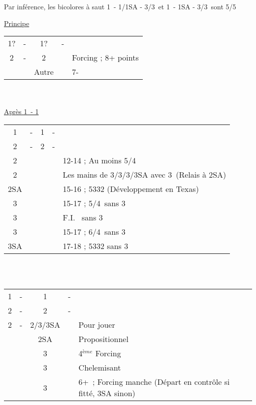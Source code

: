 \documentclass[a4paper, oneside, 11pt]{report}
\begin{document}
		Par inférence, les bicolores à saut 1\coeur\ - 1\pique/1SA - 3\trefle/3\carreau\ et 1\pique\ - 1SA - 3\carreau/3\coeur\ sont 5/5
		
\newpage
		\underline{Principe}
		
		\begin{tabular}{cccc|l}
		1? & - & 1? & - &\\
		2\trefle & - & 2\carreau && Forcing ; 8+ points\\
		&& Autre && 7-\\
		\end{tabular}\\\\
		
		\underline{Après 1\coeur\ - 1\pique}

		\begin{tabular}{cccc|l}
		1\coeur & - & 1\pique & - &\\
		2\trefle & - & 2\carreau & - &\\
		2\coeur &&&& 12-14 ; Au moins 5\coeur/4\trefle\\
		2\pique &&&& Les mains de 3\trefle/3\carreau/3\coeur/3SA avec 3\pique\ (Relais à 2SA)\\
		2SA &&&& 15-16 ; 5332 (Développement en Texas)\\
		3\trefle &&&& 15-17 ; 5\coeur/4\trefle\ sans 3\pique\\
		3\carreau &&&& F.I. \coeur\ sans 3\pique\\
		3\coeur &&&& 15-17 ; 6\coeur/4\trefle\ sans 3\pique\\
		3SA &&&& 17-18 ; 5332 sans 3\pique\\
		\end{tabular}\\\\

		\begin{tabular}{cccc|l}
		1\coeur & - & 1\pique & - &\\
		2\trefle & - & 2\carreau & - &\\
		2\coeur & - & 2\pique/3\trefle/3SA && Pour jouer\\
		&& 2SA && Propositionnel\\
		&& 3\carreau && 4$^{ème}$ Forcing\\
		&& 3\coeur && Chelemisant \coeur\\
		&& 3\pique && 6+\pique\ ; Forcing manche (Départ en contrôle si fitté, 3SA sinon)\\
		\end{tabular}\\\\
\end{document}
